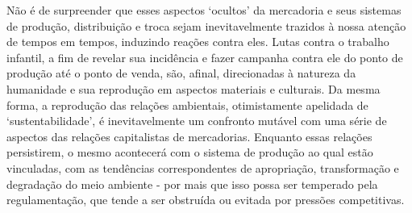  \par 
Não é de surpreender que esses aspectos ‘ocultos’ da mercadoria e seus sistemas de produção, distribuição e troca sejam inevitavelmente trazidos à nossa atenção de tempos em tempos, induzindo reações contra eles. Lutas contra o trabalho infantil, a fim de revelar sua incidência e fazer campanha contra ele do ponto de produção até o ponto de venda, são, afinal, direcionadas à natureza da humanidade e sua reprodução em aspectos materiais e culturais. Da mesma forma, a reprodução das relações ambientais, otimistamente apelidada de ‘sustentabilidade’, é inevitavelmente um confronto mutável com uma série de aspectos das relações capitalistas de mercadorias. Enquanto essas relações persistirem, o mesmo acontecerá com o sistema de produção ao qual estão vinculadas, com as tendências correspondentes de apropriação, transformação e degradação do meio ambiente - por mais que isso possa ser temperado pela regulamentação, que tende a ser obstruída ou evitada por pressões competitivas.
 \par 
